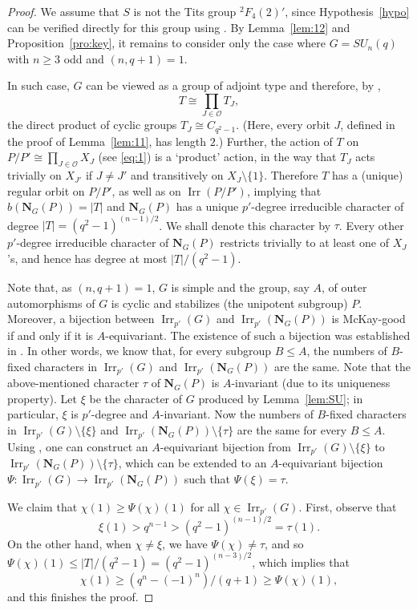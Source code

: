 \documentclass[12pt]{amsart}
\theoremstyle{plain}
\theoremstyle{definition}
\numberwithin{equation}{section}
\newcommand{\Irr}{\operatorname{Irr}}
\newcommand{\bN}{\mathbf{N}}
\begin{document}
\begin{proof}
We assume that $S$ is not the Tits group ${}^2F_4(2)'$, since
Hypothesis~\ref{hypo} can be verified directly for this group using
\cite{GAP}. By Lemma~\ref{lem:12} and Proposition~\ref{pro:key}, it
remains to consider only the case where $G = SU_n(q)$ with $n \geq
3$ odd and $(n, q+1) = 1$.

In such case, $G$ can be viewed as a group of adjoint type and
therefore, by \cite[\S2.9]{Carter85}, \[T\cong\prod_{J\in
\mathcal{O}} T_J,\] the direct product of cyclic groups $T_J\cong
C_{q^2-1}$. (Here, every orbit $J$, defined in the proof of
Lemma~\ref{lem:11}, has length $2$.) Further, the action of $T$ on
$P/P'\cong \prod_{J\in \mathcal{O}} X_J$ (see \eqref{eq:1}) is a
`product' action, in the way that $T_J$ acts trivially on $X_{J'}$
if $J\neq J'$ and transitively on $X_J \setminus \{1\}$. Therefore
$T$ has a (unique) regular orbit on $P/P'$, as well as on
$\Irr(P/P')$, implying that $b(\bN_G(P))=|T|$ and $\bN_G(P)$ has a
unique $p'$-degree irreducible character of degree
$|T|=(q^2-1)^{(n-1)/2}$. We shall denote this character by $\tau$.
Every other $p'$-degree irreducible character of $\bN_G(P)$
restricts trivially to at least one of $X_J$'s, and hence has degree
at most $|T|/(q^2-1)$.

Note that, as $(n,q+1)=1$, $G$ is simple and the group, say $A$, of
outer automorphisms of $G$ is cyclic and stabilizes (the unipotent
subgroup) $P$. Moreover, a bijection between $\Irr_{p'}(G)$ and
$\Irr_{p'}(\bN_G(P))$ is McKay-good if and only if it is
$A$-equivariant. The existence of such a bijection was established
in \cite{Brunat09,Spath12}. In other words, we know that, for every
subgroup $B\leq A$, the numbers of $B$-fixed characters in
$\Irr_{p'}(G)$ and $\Irr_{p'}(\bN_G(P))$ are the same. Note that the
above-mentioned character $\tau$ of $\bN_G(P)$ is $A$-invariant (due
to its uniqueness property). Let $\xi$ be the character of $G$
produced by Lemma~\ref{lem:SU}; in particular, $\xi$ is $p'$-degree
and $A$-invariant. Now the numbers of $B$-fixed characters in
$\Irr_{p'}(G)\setminus\{\xi\}$ and
$\Irr_{p'}(\bN_G(P))\setminus\{\tau\}$ are the same for every $B\leq
A$. Using \cite[Lemma~13.23]{Is}, one can construct an
$A$-equivariant bijection from $\Irr_{p'}(G)\setminus\{\xi\}$ to
$\Irr_{p'}(\bN_G(P))\setminus\{\tau\}$, which can be extended to an
$A$-equivariant bijection $\Psi:\Irr_{p'}(G)\to\Irr_{p'}(\bN_G(P))$
such that $\Psi(\xi)=\tau$.

We claim that $\chi(1)\geq \Psi(\chi)(1)$ for all $\chi\in
\Irr_{p'}(G)$. First, observe that
\[\xi(1)>q^{n-1}>(q^2-1)^{(n-1)/2}=\tau(1).\] On the other hand,
when $\chi\neq\xi$, we have $\Psi(\chi)\neq \tau$, and so
$\Psi(\chi)(1)\leq |T|/(q^2-1)=(q^2-1)^{(n-3)/2}$, which implies
that
\[
\chi(1)\geq (q^n-(-1)^n)/(q+1)\geq \Psi(\chi)(1),
\]
and this finishes the proof.
\end{proof}
\end{document}
